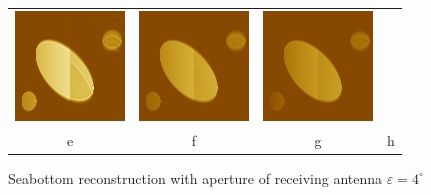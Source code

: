 \documentclass{procDDs}
\begin{document}
\begin{figure}[h!]
\begin{tabular}{cccc}
		\includegraphics[width=0.2\linewidth]{img/7/7.jpg}&
		\includegraphics[width=0.2\linewidth]{img/7/8.jpg}&
		\includegraphics[width=0.2\linewidth]{img/7/9.jpg}\\
		e & f & g & h
	\end{tabular}
	\caption{Seabottom reconstruction with aperture of receiving antenna $\varepsilon=4^\circ$}
	\label{ris:desc3}
\end{figure}
\end{document}
